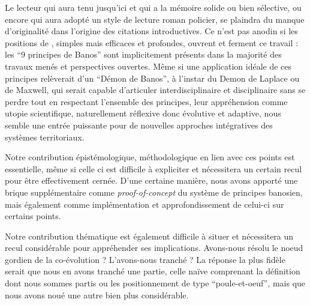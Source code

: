 Le lecteur qui aura tenu jusqu'ici et qui a la mémoire solide ou bien sélective, ou encore qui aura adopté un style de lecture roman policier, se plaindra du manque d'originalité dans l'origine des citations introductives. Ce n'est pas anodin si les positions de , simples mais efficaces et profondes, ouvrent et ferment ce travail : les ``9 principes de Banos'' sont implicitement présents dans la majorité des travaux menés et perspectives ouvertes. Même si une application idéale de ces principes relèverait d'un ``Démon de Banos'', à l'instar du Demon de Laplace ou de Maxwell, qui serait capable d'articuler interdisciplinaire et disciplinaire sans se perdre tout en respectant l'ensemble des principes, leur appréhension comme utopie scientifique, naturellement réflexive donc évolutive et adaptive, nous semble une entrée puissante pour de nouvelles approches intégratives des systèmes territoriaux. 

Notre contribution épistémologique, méthodologique en lien avec ces points est essentielle, même si celle ci est difficile à expliciter et nécessitera un certain recul pour être effectivement cernée. D'une certaine manière, nous avons apporté une brique supplémentaire comme \emph{proof-of-concept} du système de principes banosien, mais également comme implémentation et approfondissement de celui-ci sur certains points.



Notre contribution thématique est également difficile à situer et nécessitera un recul considérable pour appréhender ses implications. Avons-nous résolu le noeud gordien de la co-évolution ? L'avons-nous tranché ? La réponse la plus fidèle serait que nous en avons tranché une partie, celle naïve comprenant la définition dont nous sommes partis ou les positionnement de type ``poule-et-oeuf'', mais que nous avons noué une autre bien plus considérable.






















